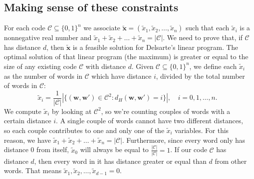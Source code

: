 \subsection{Making sense of these constraints}
For each code $\mathcal{C} \subseteq \{0,1\}^n$ we associate $\mathbf{\tilde{x}}=(\tilde{x}_1, \tilde{x}_2, \ldots, \tilde{x}_n)$ such that each $\tilde{x}_i$ is a nonnegative real number and $\tilde{x}_1+\tilde{x}_2+\ldots+\tilde{x}_n=|\mathcal{C}|$.
We need to prove that, if $\mathcal{C}$ has distance $d$, then $\mathbf{\tilde{x}}$ is a feasible solution for Delsarte's linear program.
The optimal solution of that linear program (the maximum) is greater or equal to the size of any existing code $\mathcal{C}$ with distance $d$. %
Given $\mathcal{C} \subseteq \{0,1\}^n$, we define each $\tilde{x}_i$ as the number of words in $\mathcal{C}$ which have distance $i$, divided by the total number of words in $\mathcal{C}$:
\begin{equation}
    \label{xtildei}
    \tilde{x}_i = \frac{1}{|\mathcal{C}|} | \{ (\mathbf{w}, \mathbf{w}')\in\mathcal{C}^2:d_H(\mathbf{w}, \mathbf{w}')=i\}|, \quad i=0,1, \ldots,n.
\end{equation}
We compute $\tilde{x}_i$ by looking at $\mathcal{C}^2$, so we're counting couples of words with a certain distance $i$. A single couple of words cannot have two different distances, so each couple contributes to one and only one of the $\tilde{x}_i$ variables. For this reason, we have $\tilde{x}_1+\tilde{x}_2+\ldots+\tilde{x}_n=|\mathcal{C}|$.
Furthermore, since every word only has distance 0 from itself, $\tilde{x}_0$ will always be equal to $\frac{|\mathcal{C}|}{|\mathcal{C}|}=1$.
If our code $\mathcal{C}$ has distance $d$, then every word in it has distance greater or equal than $d$ from other words. That means $\tilde{x}_1, \tilde{x}_2, \ldots, \tilde{x}_{d-1}=0$.
